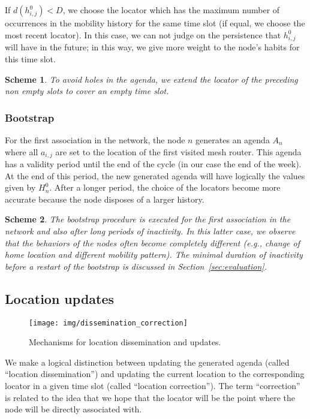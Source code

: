 \documentclass[a4paper]{sig-alternate-10pt}
\newtheorem{scheme}{Scheme}
\begin{document}
If $d(h_{i,j}^0) < D$, we choose the locator which has the maximum
number of occurrences in the mobility history for the same time slot
(if equal, we choose the most recent locator). In this case, we can
not judge on the persistence that $h_{i,j}^0$ will have in the
future; in this way, we give more weight to the node's habits for
this time slot.

\begin{scheme}
To avoid holes in the agenda, we extend the locator of the preceding
non empty slots to cover an empty time slot.
\end{scheme}

\subsubsection{Bootstrap}
\label{subsubsec:bootstrap}

For the first association in the network, the node $n$ generates an
agenda $A_n$ where all $a_{i,j}$ are set to the location of the first
visited mesh router. This agenda has a validity period until the end
of the cycle (in our case the end of the week). At the end of this 
period, the new generated agenda will have logically the values 
given by $H_{n}^0$. After a longer period, the choice of the locators 
become more accurate because the node disposes of a larger history.

\begin{scheme}
The bootstrap procedure is executed for the first association in the
network and also after long periods of inactivity. In this latter
case, we observe that the behaviors of the nodes often become
completely different (e.g., change of home location and different
mobility pattern). The minimal duration of inactivity before a
restart of the bootstrap is discussed in
Section~\ref{sec:evaluation}.
\end{scheme}

\subsection{Location updates}

\begin{figure}
 \centering
 \texttt{[image: img/dissemination\_correction]}
 \caption{Mechanisms for location dissemination and updates.}
\label{fig:dissemination}
\end{figure}

We make a logical distinction between updating the generated agenda
(called ``location dissemination'') and updating the current
location to the corresponding locator in a given time slot (called
``location correction''). The term ``correction'' is related to the
idea that we hope that the locator will be the point where the node
will be directly associated with.
\end{document}
